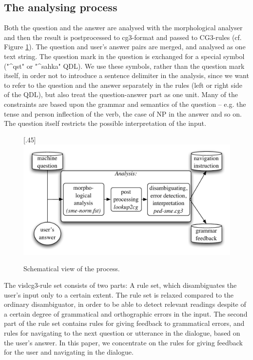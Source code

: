 \documentclass[11pt]{article}
\begin{document}
\subsection{The analysing process} 
Both the question and the answer are analysed with the morphological analyser and then the result is postprocessed to cg3-format and passed to CG3-rules (cf. Figure \ref{nounlex}). The question and user's answer pairs are merged, and analysed as one text string. The question mark in the question is exchanged for a special symbol ("\^{}qst" or "\^{}sahka" QDL). We use these symbols, rather than the question mark itself, in order not to introduce a sentence delimiter in the analysis, since we want to refer to the question and the answer separately in the rules (left or right side of the QDL), but also treat the question-answer part as one unit. Many of the constraints are based upon the grammar and semantics of the question -- e.g. the tense and person inflection of the verb, the case of NP in the answer and so on. The question itself restricts the possible interpretation of the input. \\

\begin{figure}[htbp]
\begin{center}
\scalebox{.45}[.45]{\includegraphics{presentation/img/qa2.pdf}}\\
\caption{Schematical view of the process.}
\label{nounlex}
\end{center}
\end{figure}



The vislcg3-rule set consists of two parts: A rule set, which disambiguates the user's input only to a certain extent. The rule set is relaxed compared to the ordinary disambiguator, in order to be able to detect relevant readings despite of a certain degree of grammatical and orthographic errors in the input. The second part of the rule set contains rules for giving feedback to grammatical errors, and rules for navigating to the next question or utterance in the dialogue, based on the user's answer.  In this paper, we concentrate on the rules for giving feedback for the user and navigating in the dialogue.
\end{document}
